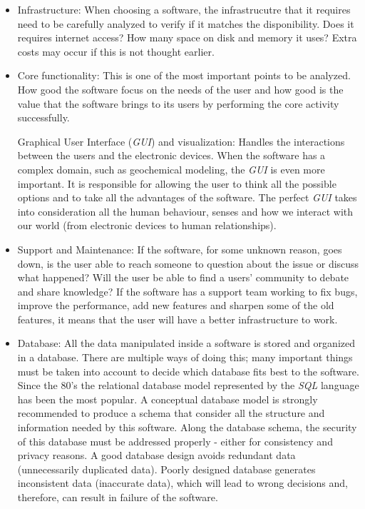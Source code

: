 \begin{itemize}
\item Infrastructure: When choosing a software, the infrastrucutre that it requires need to be carefully analyzed to verify if it matches the disponibility. Does it requires internet access? How many space on disk and memory it uses? Extra costs may occur if this is not thought earlier.

\item Core functionality: This is one of the most important points to be analyzed. How good the software focus on the needs of the user and how good is the value that the software brings to its users by performing the core activity successfully.

Graphical User Interface (\emph{GUI}) and visualization: Handles the interactions between the users and the electronic devices. When the software has a complex domain, such as geochemical modeling, the \emph{GUI} is even more important. It is responsible for allowing the user to think all the possible options and to take all the advantages of the software. The perfect \emph{GUI} takes into consideration all the human behaviour, senses and how we interact with our world (from electronic devices to human relationships).

\item Support and Maintenance: If the software, for some unknown reason, goes down, is the user able to reach someone to question about the issue or discuss what happened? Will the user be able to find a users' community to debate and share knowledge? If the software has a support team working to fix bugs, improve the performance, add new features and sharpen some of the old features, it means that the user will have a better infrastructure to work.

\item Database: All the data manipulated inside a software is stored and organized in a database. There are multiple ways of doing this; many important things must be taken into account to decide which database fits best to the software. Since the 80's the relational database model represented by the \emph{SQL} language has been the most popular. A conceptual database model is strongly recommended to produce a schema that consider all the structure and information needed by this software. Along the database schema, the security of this database must be addressed properly - either for consistency and privacy reasons. A good database design avoids redundant data (unnecessarily duplicated data). Poorly designed database generates inconsistent data (inaccurate data), which will lead to wrong decisions and, therefore, can result in failure of the software.
\end{itemize}


